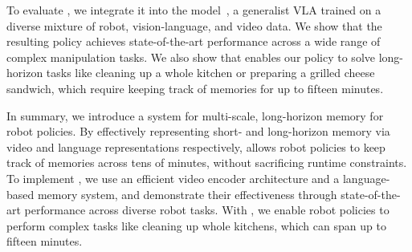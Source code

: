 To evaluate \Acronym{}, we integrate it into the \pizerosix{} model~\citep{pi06_model_card}, a generalist VLA trained on a diverse mixture of robot, vision-language, and video data.
We show that the resulting policy achieves state-of-the-art performance across a wide range of complex manipulation tasks. We also show that \Acronym{} enables our policy to solve long-horizon tasks like cleaning up a whole kitchen or preparing a grilled cheese sandwich, which require keeping track of memories for up to fifteen minutes.

In summary, we introduce a system for multi-scale, long-horizon memory for robot policies. By effectively representing short- and long-horizon memory via video and language representations respectively, \Acronym{} allows robot policies to keep track of memories across tens of minutes, without sacrificing runtime constraints. To implement \Acronym{}, we use an efficient video encoder architecture and a language-based memory system, and demonstrate their effectiveness through state-of-the-art performance across diverse robot tasks. With \Acronym{}, we enable robot policies to perform complex tasks like cleaning up whole kitchens, which can span up to fifteen minutes.























